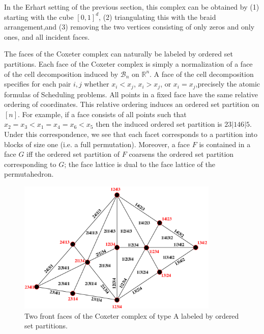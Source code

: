\documentclass[12pt,reqno]{amsart}
\numberwithin{definition}{section}
\theoremstyle{definition}
\begin{document}
 In the Erhart setting of the previous section, this complex
can be obtained by (1) starting with the cube $[0,1]^d$, (2) triangulating 
this with the braid arrangement,and (3) removing the two vertices consisting of 
only zeros and only ones, and all incident faces. 


The faces of the Coxeter complex can naturally be labeled by ordered
set partitions.  Each face of the Coxeter complex is simply a
normalization of a face of the cell decomposition induced by
$\mathcal{B}_n$ on $\mathbb{R}^n$.  A face of the cell decomposition specifies for each pair $i,j$ whether $x_i < x_j$, $x_i > x_j$, or $x_i = x_j$,precisely the atomic formulas of Scheduling problems.  All points in a fixed face have
the same relative ordering of coordinates.  This relative ordering
induces an ordered set partition on $[n]$.  For example, if a face
consists of all points such that $x_2 = x_3 < x_1 =
x_4 = x_6 < x_5$ then the induced ordered set partition is
$23|146|5$.  Under this correspondence, we see that each facet
corresponds to a partition into blocks of size one (i.e. a full
permutation).  Moreover, a face $F$ is contained in a face $G$ iff
the ordered set partition of $F$ coarsens the ordered set partition
corresponding to $G$; the face lattice is dual to the face lattice of the permutahedron.

\begin{figure}[h]
\includegraphics[height=2.5in]{Cox.pdf}
\caption{Two front faces of the Coxeter complex of type A labeled by ordered set partitions.}
\end{figure}


\end{document}
